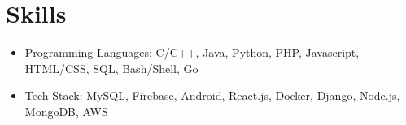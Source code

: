\documentclass{resume}
\begin{document}
\section{Skills}
\begin{itemize}[parsep=0.5ex]
  \item Programming Languages: C/C++, Java, Python, PHP, Javascript, HTML/CSS, SQL, Bash/Shell, Go
  \item Tech Stack: MySQL, Firebase, Android, React.js, Docker, Django, Node.js, MongoDB, AWS
\end{itemize}
\end{document}
